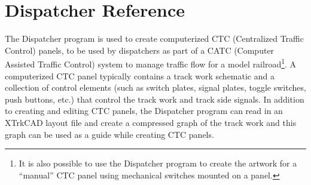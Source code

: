

\chapter{Dispatcher Reference}
\label{chpt:dispatcher:Reference}

The Dispatcher program is used to create computerized CTC (Centralized
Traffic Control) panels, to be used by dispatchers as part of a CATC
(Computer Assisted Traffic Control) system to manage traffic flow for a
model railroad\footnote{It is also possible to use the Dispatcher
program to create the artwork for a ``manual'' CTC panel using
mechanical switches mounted on a panel.}.  A computerized CTC panel
typically contains a track work schematic and a collection of control
elements (such as switch plates, signal plates, toggle switches, push
buttons, etc.) that control the track work and track side signals.  In
addition to creating and editing CTC panels, the Dispatcher program can
read in an XTrkCAD layout file and create a compressed graph of the
track work and this graph can be used as a guide while creating CTC
panels.

